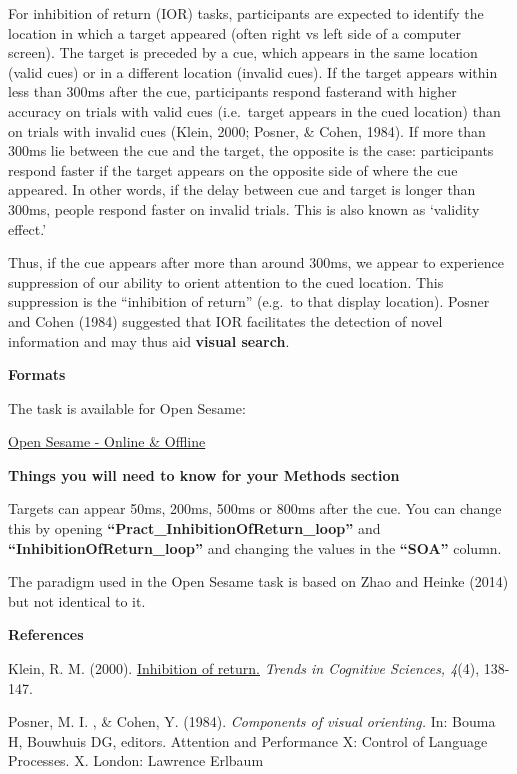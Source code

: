 \documentclass[
]{book}
\begin{document}
For inhibition of return (IOR) tasks, participants are expected to identify the location in which a target appeared (often right vs left side of a computer screen). The target is preceded by a cue, which appears in the same location (valid cues) or in a different location (invalid cues). If the target appears within less than 300ms after the cue, participants respond fasterand with higher accuracy on trials with valid cues (i.e.~target appears in the cued location) than on trials with invalid cues (Klein, 2000; Posner, \& Cohen, 1984). If more than 300ms lie between the cue and the target, the opposite is the case: participants respond faster if the target appears on the opposite side of where the cue appeared. In other words, if the delay between cue and target is longer than 300ms, people respond faster on invalid trials. This is also known as `validity effect.'

Thus, if the cue appears after more than around 300ms, we appear to experience suppression of our ability to orient attention to the cued location. This suppression is the ``inhibition of return'' (e.g.~to that display location). Posner and Cohen (1984) suggested that IOR facilitates the detection of novel information and may thus aid \textbf{visual search}.

\textbf{Formats}

The task is available for Open Sesame:

\href{https://github.com/jmattschey/MScConversionExperiments/blob/master/GitHub/InhibitionofReturn.zip}{Open Sesame - Online \& Offline}

\textbf{Things you will need to know for your Methods section}

Targets can appear 50ms, 200ms, 500ms or 800ms after the cue. You can change this by opening \textbf{``Pract\_InhibitionOfReturn\_loop''} and \textbf{``InhibitionOfReturn\_loop''} and changing the values in the \textbf{``SOA''} column.

The paradigm used in the Open Sesame task is based on Zhao and Heinke (2014) but not identical to it.

\textbf{References}

Klein, R. M. (2000). \href{https://www.researchgate.net/profile/Juan_Lupianez/publication/233995999_Inhibition_of_Return/links/0c960525d778745c66000000/Inhibition-of-Return.pdf}{Inhibition of return.} \emph{Trends in Cognitive Sciences, 4}(4), 138-147.

Posner, M. I. , \& Cohen, Y. (1984). \emph{Components of visual orienting.} In: Bouma H, Bouwhuis DG, editors. Attention and Performance X: Control of Language Processes. X. London: Lawrence Erlbaum
\end{document}
